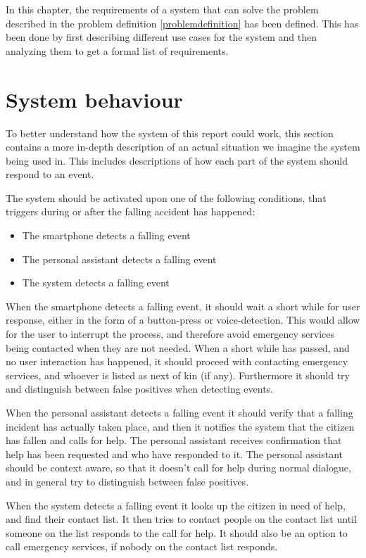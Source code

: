 In this chapter, the requirements of a system that can solve the problem described in the problem definition \ref{problemdefinition} has been defined. This has been done by first describing different use cases for the system and then analyzing them to get a formal list of requirements.

\section{System behaviour}
To better understand how the system of this report could work, this section contains a more in-depth description of an actual situation we imagine the system being used in. This includes descriptions of how each part of the system should respond to an event.

The system should be activated upon one of the following conditions, that triggers during or after the falling accident has happened:

\begin{itemize}
    \item The smartphone detects a falling event
    \item The personal assistant detects a falling event
    \item The system detects a falling event
\end{itemize}

When the smartphone detects a falling event, it should wait a short while for user response, either in the form of a button-press or voice-detection. This would allow for the user to interrupt the process, and therefore avoid emergency services being contacted when they are not needed. When a short while has passed, and no user interaction has happened, it should proceed with contacting emergency services, and whoever is listed as next of kin (if any).
Furthermore it should try and distinguish between false positives when detecting events. 

When the personal assistant detects a falling event it should verify that a falling incident has actually taken place, and then it notifies the system that the citizen has fallen and calls for help. The personal assistant receives confirmation that help has been requested and who have responded to it. The personal assistant should be context aware, so that it doesn't call for help during normal dialogue, and in general try to distinguish between false positives.

When the system detects a falling event it looks up the citizen in need of help, and find their contact list. It then tries to contact people on the contact list until someone on the list responds to the call for help. It should also be an option to call emergency services, if nobody on the contact list responds.

